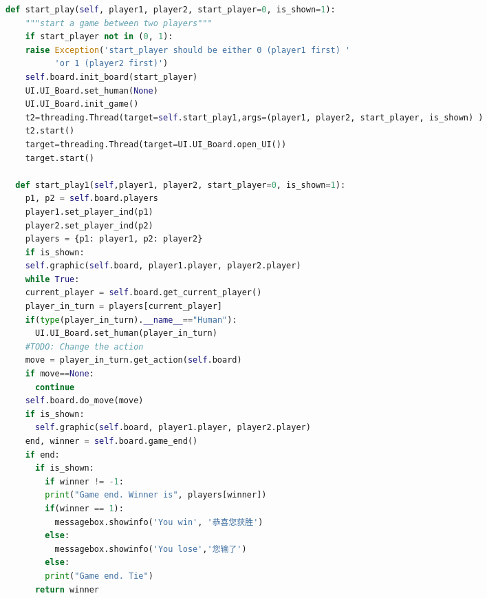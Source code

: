 \documentclass[a4paper]{article}
\begin{document}
\begin{multicols}{2}
\begin{lstlisting}[language=Python,breaklines = true,columns=flexible]
  def start_play(self, player1, player2, start_player=0, is_shown=1):
    """start a game between two players"""
    if start_player not in (0, 1):
    raise Exception('start_player should be either 0 (player1 first) '
          'or 1 (player2 first)')
    self.board.init_board(start_player)
    UI.UI_Board.set_human(None)
    UI.UI_Board.init_game()
    t2=threading.Thread(target=self.start_play1,args=(player1, player2, start_player, is_shown) )
    t2.start()
    target=threading.Thread(target=UI.UI_Board.open_UI())
    target.start()

  def start_play1(self,player1, player2, start_player=0, is_shown=1):
    p1, p2 = self.board.players
    player1.set_player_ind(p1)
    player2.set_player_ind(p2)
    players = {p1: player1, p2: player2}
    if is_shown:
    self.graphic(self.board, player1.player, player2.player)
    while True:
    current_player = self.board.get_current_player()
    player_in_turn = players[current_player]
    if(type(player_in_turn).__name__=="Human"):
      UI.UI_Board.set_human(player_in_turn)
    #TODO: Change the action
    move = player_in_turn.get_action(self.board)
    if move==None:
      continue
    self.board.do_move(move)
    if is_shown:
      self.graphic(self.board, player1.player, player2.player)
    end, winner = self.board.game_end()
    if end:
      if is_shown:
        if winner != -1:
        print("Game end. Winner is", players[winner])
        if(winner == 1):
          messagebox.showinfo('You win', '恭喜您获胜')
        else:
          messagebox.showinfo('You lose','您输了')
        else:
        print("Game end. Tie")
      return winner


\end{lstlisting}
\end{multicols}
\end{document}
